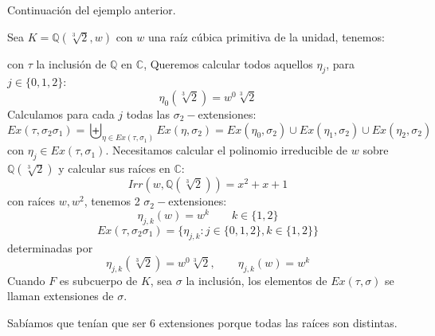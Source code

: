 \begin{ejercicio}
    Continuación del ejemplo anterior.

    \noindent
    Sea $K = \mathbb{Q}(\sqrt[3]{2},w)$ con $w$ una raíz cúbica primitiva de la unidad, tenemos:
    \begin{figure}[H]
        \centering
    \end{figure}
    con $\tau$ la inclusión de $\mathbb{Q}$ en $\mathbb{C}$, Queremos calcular todos aquellos $\eta_j$, para $j\in \{0,1,2\}$:
    \begin{equation*}
        \eta_0(\sqrt[3]{2}) = w^0 \sqrt[3]{2}
    \end{equation*}
    Calculamos para cada $j$ todas las $\sigma_2-$extensiones:
    \begin{equation*}
        Ex(\tau,\sigma_2\sigma_1) = \biguplus_{\eta \in  Ex(\tau,\sigma_1)}Ex(\eta, \sigma_2) = Ex(\eta_0,\sigma_2) \cup Ex(\eta_1, \sigma_2) \cup Ex(\eta_2,\sigma_2)
    \end{equation*}
    con $\eta_j\in Ex(\tau, \sigma_1)$.
    Necesitamos calcular el polinomio irreducible de $w$ sobre $\mathbb{Q}(\sqrt[3]{2})$ y calcular sus raíces en $\mathbb{C}$:
    \begin{equation*}
        Irr(w,\mathbb{Q}(\sqrt[3]{2})) = x^2+x+1
    \end{equation*}
    con raíces $w,w^2$, tenemos 2 $\sigma_2-$extensiones:
    \begin{equation*}
        \eta_{j,k}(w) = w^k \qquad k \in \{1,2\}
    \end{equation*}
    \begin{equation*}
        Ex(\tau,\sigma_2\sigma_1) = \{\eta_{j,k} : j\in \{0,1,2\}, k\in \{1,2\}\}
    \end{equation*}
    determinadas por
    \begin{equation*}
        \eta_{j,k}(\sqrt[3]{2}) = w^0\sqrt[3]{2}, \qquad \eta_{j,k}(w)= w^k
    \end{equation*}
    Cuando $F$ es subcuerpo de $K$, sea $\sigma$ la inclusión, los elementos de $Ex(\tau,\sigma)$ se llaman extensiones de $\sigma$.

    Sabíamos que tenían que ser 6 extensiones porque todas las raíces son distintas.
\end{ejercicio}

